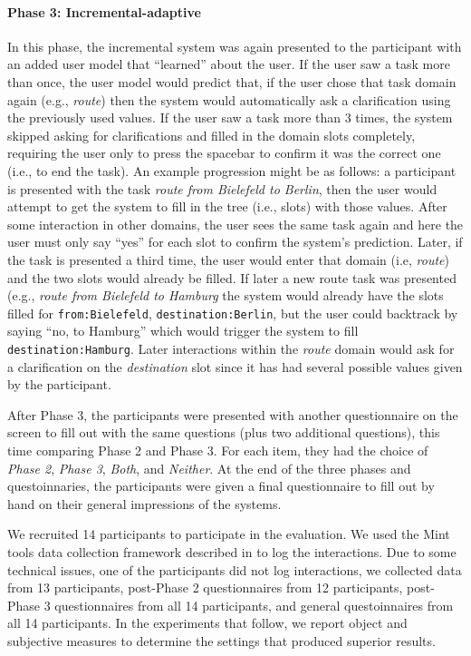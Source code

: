 \documentclass[11pt]{article}
\begin{document}
\paragraph{Phase 3: Incremental-adaptive} In this phase, the incremental system was again presented to the participant with an added user model that ``learned'' about the user. If the user saw a task more than once, the user model would predict that, if the user chose that task domain again (e.g., \emph{route}) then the system would automatically ask a clarification using the previously used values. If the user saw a task more than 3 times, the system skipped asking for clarifications and filled in the domain slots completely, requiring the user only to press the spacebar to confirm it was the correct one (i.e., to end the task). An example progression might be as follows: a participant is presented with the task \emph{route from Bielefeld to Berlin}, then the user would attempt to get the system to fill in the tree (i.e., slots) with those values. After some interaction in other domains, the user sees the same task again and here the user must only say ``yes'' for each slot to confirm the system's prediction. Later, if the task is presented a third time, the user would enter that domain (i.e, \emph{route}) and the two slots would already be filled. If later a new route task was presented (e.g., \emph{route from Bielefeld to Hamburg} the system would already have the slots filled for \texttt{from:Bielefeld}, \texttt{destination:Berlin}, but the user could backtrack by saying ``no, to Hamburg'' which would trigger the system to fill \texttt{destination:Hamburg}. Later interactions within the \emph{route} domain would ask for a clarification on the \emph{destination} slot since it has had several possible values given by the participant. 

After Phase 3, the participants were presented with another questionnaire on the screen to fill out with the same questions (plus two additional questions), this time comparing Phase 2 and Phase 3. For each item, they had the choice of \emph{Phase 2}, \emph{Phase 3}, \emph{Both}, and \emph{Neither}. At the end of the three phases and questoinnaries, the participants were given a final questionnaire to fill out by hand on their general impressions of the systems. 

We recruited 14 participants to participate in the evaluation. We used the Mint tools data collection framework described in  to log the interactions. Due to some technical issues, one of the participants did not log interactions, we collected data from 13 participants, post-Phase 2 questionnaires from 12 participants,  post-Phase 3 questionnaires from all 14 participants, and general questoinnaires from all 14 participants. In the experiments that follow, we report object and subjective measures to determine the settings that produced superior results.
\end{document}
